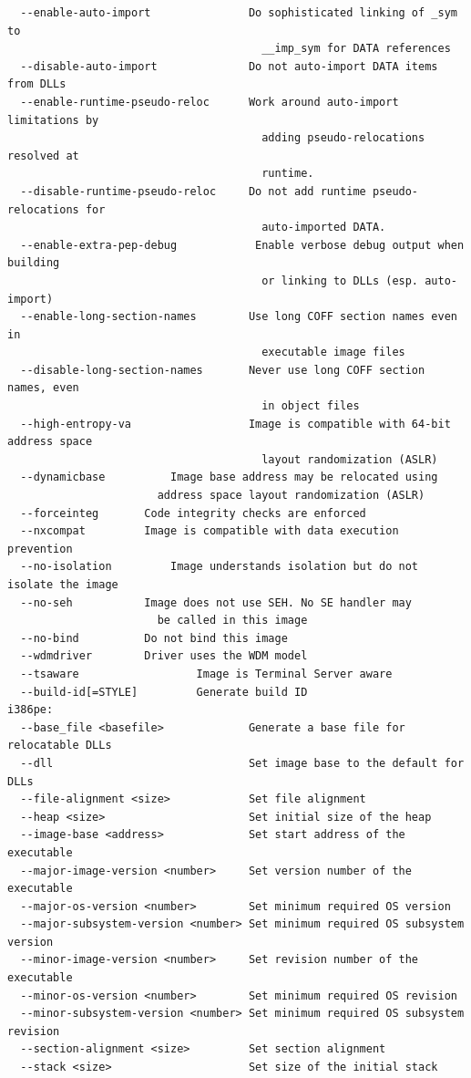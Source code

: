 \documentclass{article}
\begin{document}
\begin{lstlisting}
  --enable-auto-import               Do sophisticated linking of _sym to
                                       __imp_sym for DATA references
  --disable-auto-import              Do not auto-import DATA items from DLLs
  --enable-runtime-pseudo-reloc      Work around auto-import limitations by
                                       adding pseudo-relocations resolved at
                                       runtime.
  --disable-runtime-pseudo-reloc     Do not add runtime pseudo-relocations for
                                       auto-imported DATA.
  --enable-extra-pep-debug            Enable verbose debug output when building
                                       or linking to DLLs (esp. auto-import)
  --enable-long-section-names        Use long COFF section names even in
                                       executable image files
  --disable-long-section-names       Never use long COFF section names, even
                                       in object files
  --high-entropy-va                  Image is compatible with 64-bit address space
                                       layout randomization (ASLR)
  --dynamicbase			 Image base address may be relocated using
				       address space layout randomization (ASLR)
  --forceinteg		 Code integrity checks are enforced
  --nxcompat		 Image is compatible with data execution prevention
  --no-isolation		 Image understands isolation but do not isolate the image
  --no-seh			 Image does not use SEH. No SE handler may
				       be called in this image
  --no-bind			 Do not bind this image
  --wdmdriver		 Driver uses the WDM model
  --tsaware                  Image is Terminal Server aware
  --build-id[=STYLE]         Generate build ID
i386pe:
  --base_file <basefile>             Generate a base file for relocatable DLLs
  --dll                              Set image base to the default for DLLs
  --file-alignment <size>            Set file alignment
  --heap <size>                      Set initial size of the heap
  --image-base <address>             Set start address of the executable
  --major-image-version <number>     Set version number of the executable
  --major-os-version <number>        Set minimum required OS version
  --major-subsystem-version <number> Set minimum required OS subsystem version
  --minor-image-version <number>     Set revision number of the executable
  --minor-os-version <number>        Set minimum required OS revision
  --minor-subsystem-version <number> Set minimum required OS subsystem revision
  --section-alignment <size>         Set section alignment
  --stack <size>                     Set size of the initial stack

\end{lstlisting}
\end{document}
